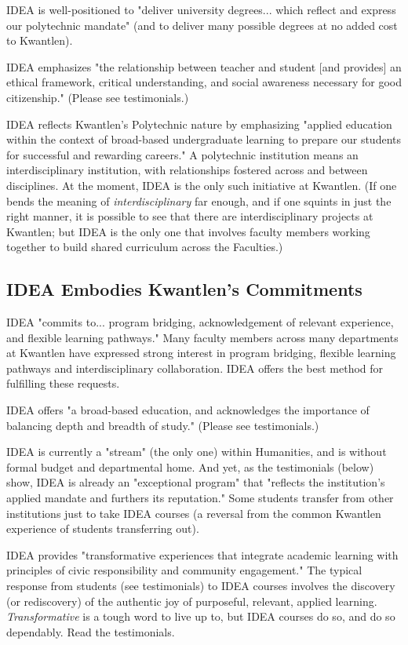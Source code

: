\documentclass[letterpaper,10pt,headsepline]{scrreprt}
\begin{document}
IDEA is well-positioned to "deliver university degrees... which reflect and express our polytechnic mandate" (and to deliver many possible degrees at no added cost to Kwantlen). 

IDEA emphasizes "the relationship between teacher and student [and provides] an ethical framework, critical understanding, and social awareness necessary for good citizenship." (Please see testimonials.)

IDEA reflects Kwantlen's Polytechnic nature by emphasizing "applied education within the context of broad-based undergraduate learning to prepare our students for successful and rewarding careers." A polytechnic institution means an interdisciplinary institution, with relationships fostered across and between disciplines. At the moment, IDEA is the only such initiative at Kwantlen. (If one bends the meaning of \textit{interdisciplinary} far enough, and if one squints in just the right manner, it is possible to see that there are interdisciplinary projects at Kwantlen; but IDEA is the only one that involves faculty members working together to build shared curriculum across the Faculties.)

\subsection{IDEA Embodies Kwantlen's Commitments}

IDEA "commits to... program bridging, acknowledgement of relevant experience, and flexible learning pathways." Many faculty members across many departments at Kwantlen have expressed strong interest in program bridging, flexible learning pathways and interdisciplinary collaboration. IDEA offers the best method for fulfilling these requests.

IDEA offers "a broad-based education, and acknowledges the importance of balancing depth and breadth of study." (Please see testimonials.)

IDEA is currently a "stream" (the only one) within Humanities, and is without formal budget and departmental home. And yet, as the testimonials (below) show, IDEA is already an "exceptional program" that "reflects the institution's applied mandate and furthers its reputation." Some students transfer from other institutions just to take IDEA courses (a reversal from the common Kwantlen experience of students transferring out). 

IDEA provides "transformative experiences that integrate academic learning with principles of civic responsibility and community engagement." The typical response from students (see testimonials) to IDEA courses involves the discovery (or rediscovery) of the authentic joy of purposeful, relevant, applied learning. \textit{Transformative} is a tough word to live up to, but IDEA courses do so, and do so dependably. Read the testimonials.
\end{document}
